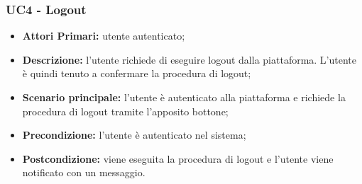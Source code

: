 \subsubsection{UC4 - Logout}
\begin{itemize}
	\item \textbf{Attori Primari:} utente autenticato;
	\item \textbf{Descrizione:} l'utente richiede di eseguire logout dalla piattaforma. L'utente è quindi tenuto a confermare la procedura di logout;
	\item \textbf{Scenario principale:} l'utente è autenticato alla piattaforma e richiede la procedura di logout tramite l'apposito bottone;
	\item \textbf{Precondizione:} l'utente è autenticato nel sistema;
	\item \textbf{Postcondizione:} viene eseguita la procedura di logout e l'utente viene notificato con un messaggio.
\end{itemize}